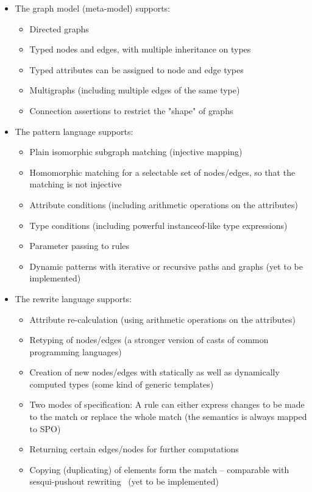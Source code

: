 \begin{itemize}
  \item The graph model (meta-model) supports:
  \begin{itemize}
    \item Directed graphs
    \item Typed nodes and edges, with multiple inheritance on types
    \item Typed attributes can be assigned to node and edge types
    \item Multigraphs (including multiple edges of the same type)
    \item Connection assertions to restrict the "shape" of graphs
  \end{itemize}
  
  \item The pattern language supports:
  \begin{itemize}
    \item Plain isomorphic subgraph matching (injective mapping)
    \item Homomorphic matching for a selectable set of nodes/edges, so that the matching is not injective
    \item Attribute conditions (including arithmetic operations on the attributes)
    \item Type conditions (including powerful instanceof-like type expressions)
    \item Parameter passing to rules
    \item Dynamic patterns with iterative or recursive paths and graphs (yet to be implemented)
  \end{itemize}
  
  \item The rewrite language supports:
  \begin{itemize}
    \item Attribute re-calculation (using arithmetic operations on the attributes)
    \item Retyping of nodes/edges (a stronger version of casts of common programming languages)
    \item Creation of new nodes/edges with statically as well as dynamically computed types (some kind of generic templates)
    \item Two modes of specification: A rule can either express changes to be made to the match or replace the whole match (the semantics is always mapped to SPO)
    \item Returning certain edges/nodes for further computations
	  \item Copying (duplicating) of elements form the match -- comparable with sesqui-pushout rewriting~\cite{ICGTXXX} (yet to be implemented)
  \end{itemize}
  

\end{itemize}
